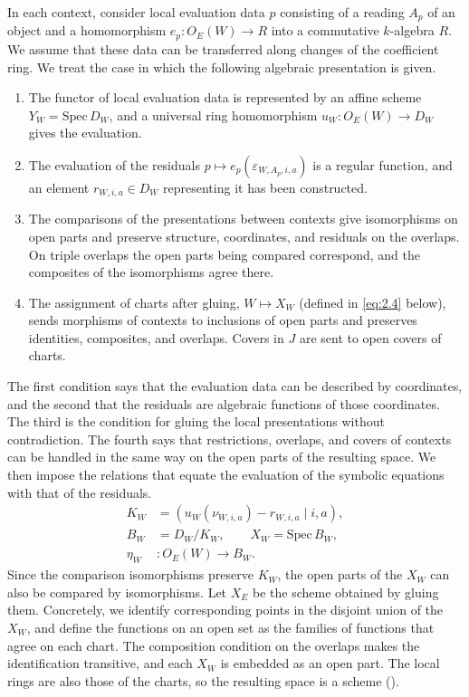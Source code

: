 \begin{construction}\label{cons:2.6}

In each context, consider local evaluation data $p$ consisting of a reading $A_p$ of an
object and a homomorphism $e_p:O_E(W)\to R$ into a commutative $k$-algebra $R$. We assume
that these data can be transferred along changes of the coefficient ring. We treat the case
in which the following algebraic presentation is given.

\begin{enumerate}
\item The functor of local evaluation data is represented by an affine scheme
$Y_W=\mathrm{Spec}\,D_W$, and a universal ring homomorphism $u_W:O_E(W)\to D_W$ gives the
evaluation.
\item The evaluation of the residuals $p\mapsto e_p(\varepsilon_{W,A_p,i,a})$ is a regular
function, and an element $r_{W,i,a}\in D_W$ representing it has been constructed.
\item The comparisons of the presentations between contexts give isomorphisms on open
parts and preserve structure, coordinates, and residuals on the overlaps. On triple
overlaps the open parts being compared correspond, and the composites of the isomorphisms
agree there.
\item The assignment of charts after gluing, $W\mapsto X_W$ (defined in \eqref{eq:2.4}
below), sends morphisms of contexts to inclusions of open parts and preserves identities,
composites, and overlaps. Covers in $J$ are sent to open covers of charts.
\end{enumerate}

The first condition says that the evaluation data can be described by coordinates, and the
second that the residuals are algebraic functions of those coordinates. The third is the
condition for gluing the local presentations without contradiction. The fourth says that
restrictions, overlaps, and covers of contexts can be handled in the same way on the open
parts of the resulting space. We then impose the relations that equate the evaluation of
the symbolic equations with that of the residuals.
\begin{equation*}
\begin{aligned}
K_W&=(u_W(\nu_{W,i,a})-r_{W,i,a}\mid i,a),\\
B_W&=D_W/K_W,\qquad X_W=\mathrm{Spec}\,B_W,\\
\eta_W&:O_E(W)\longrightarrow B_W.
\end{aligned}
\tag{2.4}\label{eq:2.4}
\end{equation*}
Since the comparison isomorphisms preserve $K_W$, the open parts of the $X_W$ can also be
compared by isomorphisms. Let $X_E$ be the scheme obtained by gluing them. Concretely, we
identify corresponding points in the disjoint union of the $X_W$, and define the functions
on an open set as the families of functions that agree on each chart. The composition
condition on the overlaps makes the identification transitive, and each $X_W$ is embedded
as an open part. The local rings are also those of the charts, so the resulting space is a
scheme
(\cite[\href{https://stacks.math.columbia.edu/tag/01JA}{\S26.14, Tag~01JA}]{Stacks}).


\end{construction}
